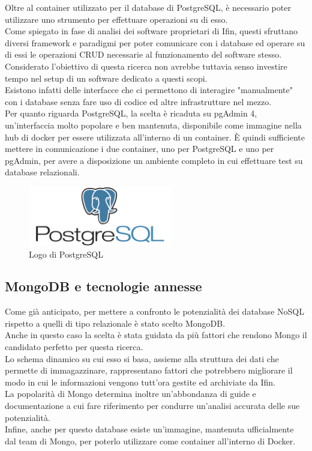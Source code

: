 \noindent Oltre al container utilizzato per il database di PostgreSQL, è necessario poter utilizzare uno strumento per effettuare operazioni su di esso.\\
Come spiegato in fase di analisi dei software proprietari di Ifin, questi sfruttano diversi framework e paradigmi per poter comunicare con i database ed operare su di essi le operazioni CRUD necessarie al funzionamento del software stesso. Considerato l'obiettivo di questa ricerca non avrebbe tuttavia senso investire tempo nel setup di un software dedicato a questi scopi.\\
Esistono infatti delle interfacce che ci permettono di interagire "manualmente" con i database senza fare uso di codice ed altre infrastrutture nel mezzo.\\
Per quanto riguarda PostgreSQL, la scelta è ricaduta su pgAdmin 4, un'interfaccia molto popolare e ben mantenuta, disponibile come immagine nella hub di docker per essere utilizzata all'interno di un container. È quindi sufficiente mettere in comunicazione i due container, uno per PostgreSQL e uno per pgAdmin, per avere a disposizione un ambiente completo in cui effettuare test su database relazionali.

\begin{figure}[htbp]
\begin{center}
\includegraphics[height=7em]{immagini/tecnologies-logos/postgresql-logo.png}
\caption{Logo di PostgreSQL}
\end{center}
\end{figure}

\subsection{MongoDB e tecnologie annesse}
Come già anticipato, per mettere a confronto le potenzialità dei database NoSQL rispetto a quelli di tipo relazionale è stato scelto MongoDB.\\
Anche in questo caso la scelta è stata guidata da più fattori che rendono Mongo il candidato perfetto per questa ricerca.\\
Lo schema dinamico su cui esso si basa, assieme alla struttura dei dati che permette di immagazzinare, rappresentano fattori che potrebbero migliorare il modo in cui le informazioni vengono tutt'ora gestite ed archiviate da Ifin.\\
La popolarità di Mongo determina inoltre un'abbondanza di guide e documentazione a cui fare riferimento per condurre un'analisi accurata delle sue potenzialità.\\
Infine, anche per questo database esiste un'immagine, mantenuta ufficialmente dal team di Mongo, per poterlo utilizzare come container all'interno di Docker.\\

